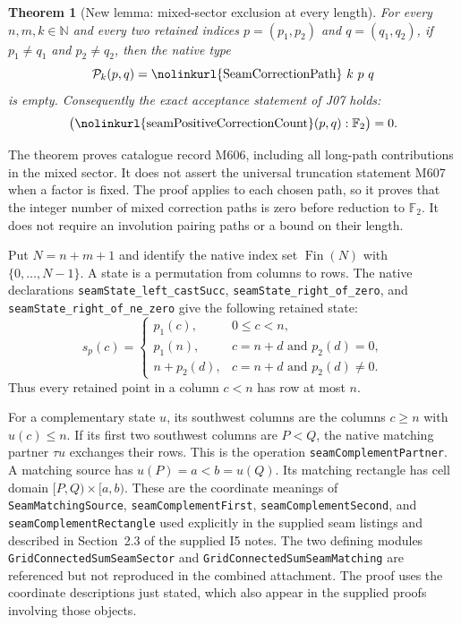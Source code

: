 \documentclass[11pt,oneside]{report}
\newtheorem{theorem}{Theorem}[section]
\theoremstyle{definition}
\numberwithin{equation}{section}
\newcommand{\F}{\mathbb F_2}
\newcommand{\decl}[1]{\textnormal{\nolinkurl{#1}}}
\newcommand{\Paths}{\mathcal P}
\begin{document}
\begin{theorem}[New lemma: mixed-sector exclusion at every length]
\label{J07:thm:j07-complete}
For every $n,m,k\in\mathbb N$ and every two retained indices
$p=(p_1,p_2)$ and $q=(q_1,q_2)$, if
$p_1\ne q_1$ and $p_2\ne q_2$, then the native type
\[
 \Paths_k(p,q)=\decl{SeamCorrectionPath}\ k\ p\ q
\]
is empty.
Consequently the exact acceptance statement of J07 holds:
\begin{equation}\label{J07:eq:j07-acceptance}
 \bigl(\decl{seamPositiveCorrectionCount}(p,q):\F\bigr)=0.
\end{equation}
\end{theorem}

The theorem proves catalogue record M606, including all long-path
contributions in the mixed sector. It does not assert the universal
truncation statement M607 when a factor is fixed.
The proof applies to each chosen path, so it proves that the integer
number of mixed correction paths is zero before reduction to $\F$.
It does not require an involution pairing paths or a bound on their length.

Put $N=n+m+1$ and identify the native index set
$\operatorname{Fin}(N)$ with $\{0,\ldots,N-1\}$.
A state is a permutation from columns to rows.
The native declarations
\decl{seamState_left_castSucc},
\decl{seamState_right_of_zero}, and
\decl{seamState_right_of_ne_zero} give the following retained state:
\begin{equation}\label{J07:eq:j07-retained}
 s_p(c)=
 \begin{cases}
 p_1(c),&0\le c<n,\\
 p_1(n),&c=n+d\text{ and }p_2(d)=0,\\
 n+p_2(d),&c=n+d\text{ and }p_2(d)\ne0.
 \end{cases}
\end{equation}
Thus every retained point in a column $c<n$ has row at most $n$.

For a complementary state $u$, its southwest columns are the columns
$c\ge n$ with $u(c)\le n$.
If its first two southwest columns are $P<Q$, the native matching
partner $\tau u$ exchanges their rows. This is the operation
\decl{seamComplementPartner}.
A matching source has $u(P)=a<b=u(Q)$.
Its matching rectangle has cell domain
$[P,Q)\times[a,b)$.
These are the coordinate meanings of
\decl{SeamMatchingSource},
\decl{seamComplementFirst},
\decl{seamComplementSecond}, and
\decl{seamComplementRectangle} used explicitly in the supplied seam
listings and described in Section~2.3 of the supplied I5 notes.
The two defining modules \decl{GridConnectedSumSeamSector} and
\decl{GridConnectedSumSeamMatching} are referenced but not reproduced
in the combined attachment. The proof uses the coordinate descriptions
just stated, which also appear in the supplied proofs involving those
objects.
\end{document}
